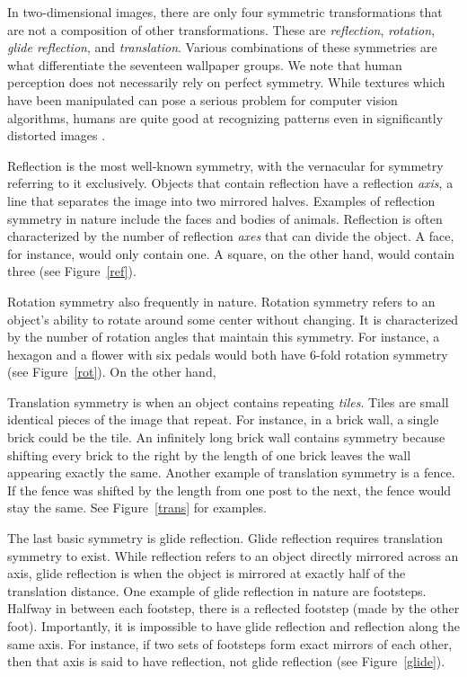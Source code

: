 

In two-dimensional images, there are only four symmetric transformations that are not a composition of other transformations. These are \textit{reflection}, \textit{rotation}, \textit{glide reflection}, and \textit{translation}. Various combinations of these symmetries are what differentiate the seventeen wallpaper groups. We note that human perception does not necessarily rely on perfect symmetry. While textures which have been manipulated can pose a serious problem for computer vision algorithms, humans are quite good at recognizing patterns even in significantly distorted images \cite{nearregular}.  

Reflection is the most well-known symmetry, with the vernacular for symmetry referring to it exclusively. Objects that contain reflection have a reflection \textit{axis}, a line that separates the image into two mirrored halves. Examples of reflection symmetry in nature include the faces and bodies of animals. Reflection is often characterized by the number of reflection \textit{axes} that can divide the object. A face, for instance, would only contain one. A square, on the other hand, would contain three (see Figure~\ref{ref}).

Rotation symmetry also frequently in nature. Rotation symmetry refers to an object's ability to rotate around some center without changing. It is characterized by the number of rotation angles that maintain this symmetry. For instance, a hexagon and a flower with six pedals would both have 6-fold rotation symmetry (see Figure~\ref{rot}). On the other hand,



Translation symmetry is when an object contains repeating \textit{tiles}. Tiles are small identical pieces of the image that repeat. For instance, in a brick wall, a single brick could be the tile. An infinitely long brick wall contains symmetry because shifting every brick to the right by the length of one brick leaves the wall appearing exactly the same. Another example of translation symmetry is a fence. If the fence was shifted by the length from one post to the next, the fence would stay the same. See Figure~\ref{trans} for examples.



The last basic symmetry is glide reflection. Glide reflection requires translation symmetry to exist. While reflection refers to an object directly mirrored across an axis, glide reflection is when the object is mirrored at exactly half of the translation distance. One example of glide reflection in nature are footsteps. Halfway in between each footstep, there is a reflected footstep (made by the other foot). Importantly, it is impossible to have glide reflection and reflection along the same axis. For instance, if two sets of footsteps form exact mirrors of each other, then that axis is said to have reflection, not glide reflection (see Figure~\ref{glide}).

